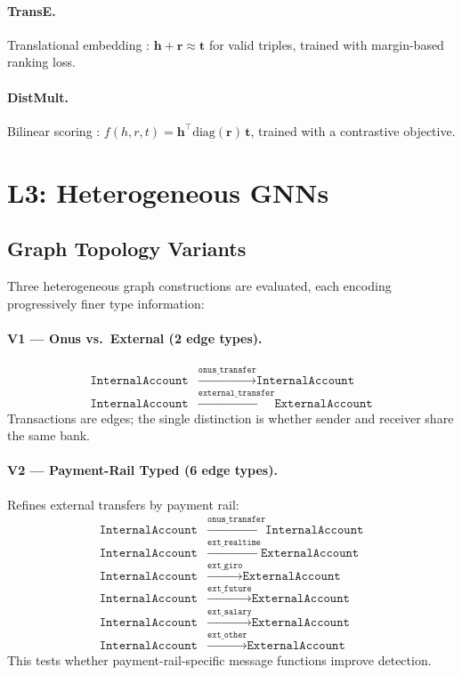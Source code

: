 \paragraph{TransE.}
Translational embedding \citep{bordes2013transe}: $\mathbf{h} + \mathbf{r} \approx \mathbf{t}$ for valid triples, trained with margin-based ranking loss.

\paragraph{DistMult.}
Bilinear scoring \citep{yang2015distmult}: $f(h,r,t) = \mathbf{h}^\top \mathrm{diag}(\mathbf{r})\,\mathbf{t}$, trained with a contrastive objective.

\section{L3: Heterogeneous GNNs}
\label{sec:l3}

\subsection{Graph Topology Variants}
\label{sec:graph-variants}

Three heterogeneous graph constructions are evaluated, each encoding progressively finer type information:

\paragraph{V1 — Onus vs.\ External (2 edge types).}
\begin{align*}
  \texttt{InternalAccount} &\xrightarrow{\texttt{onus\_transfer}} \texttt{InternalAccount} \\
  \texttt{InternalAccount} &\xrightarrow{\texttt{external\_transfer}} \texttt{ExternalAccount}
\end{align*}
Transactions are edges; the single distinction is whether sender and receiver share the same bank.

\paragraph{V2 — Payment-Rail Typed (6 edge types).}
Refines external transfers by payment rail:
\begin{align*}
  \texttt{InternalAccount} &\xrightarrow{\texttt{onus\_transfer}} \texttt{InternalAccount} \\
  \texttt{InternalAccount} &\xrightarrow{\texttt{ext\_realtime}} \texttt{ExternalAccount} \\
  \texttt{InternalAccount} &\xrightarrow{\texttt{ext\_giro}} \texttt{ExternalAccount} \\
  \texttt{InternalAccount} &\xrightarrow{\texttt{ext\_future}} \texttt{ExternalAccount} \\
  \texttt{InternalAccount} &\xrightarrow{\texttt{ext\_salary}} \texttt{ExternalAccount} \\
  \texttt{InternalAccount} &\xrightarrow{\texttt{ext\_other}} \texttt{ExternalAccount}
\end{align*}
This tests whether payment-rail-specific message functions improve detection.

